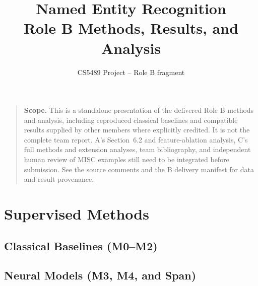 \documentclass[11pt]{article}
\title{Named Entity Recognition\\\large Role B Methods, Results, and Analysis}
\author{CS5489 Project -- Role B fragment}
\date{}
\begin{document}
\maketitle
\begin{quote}
\textbf{Scope.} This is a standalone presentation of the delivered Role B
methods and analysis, including reproduced classical baselines and compatible
results supplied by other members where explicitly credited. It is not the
complete team report. A's Section~6.2 and feature-ablation analysis, C's full
methods and extension analyses, team bibliography, and independent human review
of MISC examples still need to be integrated before submission. See the source
comments and the B delivery manifest for data and result provenance.
\end{quote}
\section{Supervised Methods}
\subsection{Classical Baselines (M0--M2)}

\subsection{Neural Models (M3, M4, and Span)}


\end{document}
